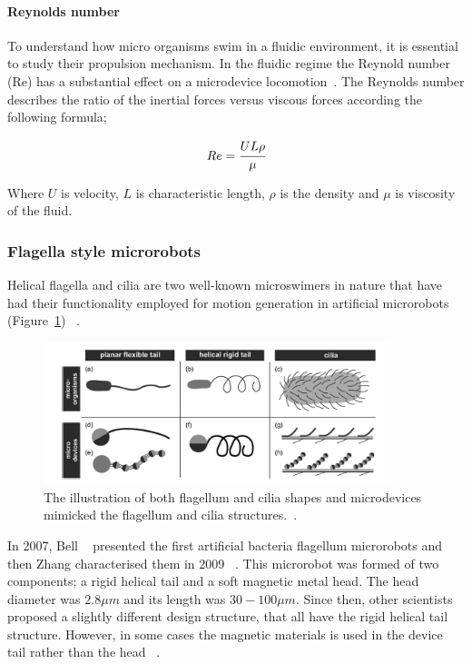 \documentclass[12pt,a4paper,titlepage]{report}
\begin{document}
\paragraph{Reynolds number}

To understand how micro organisms swim in a fluidic environment, it is essential to study their propulsion 
mechanism. In the fluidic regime the Reynold number (Re) has a substantial effect on a microdevice
locomotion~\citep{peyer2013magnetic}. The Reynolds number describes the ratio of the inertial forces versus viscous 
forces according the following formula;

\begin{equation}
  Re = \cfrac{UL\rho}{\mu}
\label{eq:4}
\end{equation}
 
Where $ U$ is velocity, $L$ is characteristic length, $\rho$ is the density and $\mu$ is viscosity of the fluid.






\subsubsection{Flagella style microrobots}

Helical flagella and cilia are two well-known microswimers in nature that have had their functionality employed 
for motion generation in artificial microrobots  (Figure~\ref{cilia}) ~\citep{gao2013bioinspired}. 



\begin{figure}
  \centering
    \includegraphics[width=0.9\textwidth]{cilia}
  \caption{The illustration of both flagellum and cilia shapes and microdevices mimicked the flagellum and cilia 
structures.~\citep{peyer2013bio}.}
  \label{cilia}
\end{figure}

In 2007, Bell ~\citep{gao2013bioinspired} presented the first artificial bacteria flagellum microrobots and then
 Zhang characterised them in 2009 ~\citep{gao2013bioinspired}. This microrobot was formed of two 
components; a rigid helical tail and a soft magnetic metal head. The head diameter 
was $2.8 \mu  m$ and its length was $30-100 \mu m$. Since then, other scientists proposed a slightly different design 
structure, that all have the rigid helical tail structure. However, in some cases the magnetic
 materials is used in the device tail rather than the head ~\citep{gao2013bioinspired}. 
 
\end{document}
